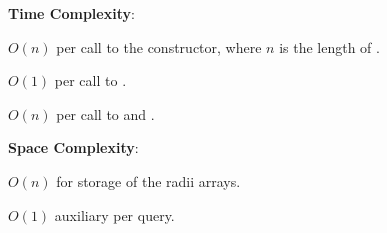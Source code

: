 \textbf{Time Complexity}:
\begin{compactitem}
  \item $O(n)$ per call to the constructor, where $n$ is the length of .
  \item $O(1)$ per call to .
  \item $O(n)$ per call to  and .
\end{compactitem}

\textbf{Space Complexity}:
\begin{compactitem}
  \item $O(n)$ for storage of the radii arrays.
  \item $O(1)$ auxiliary per query.
\end{compactitem}

